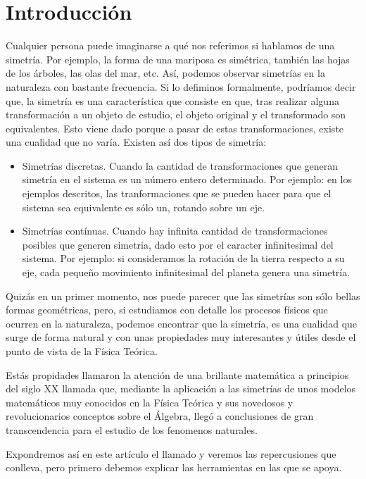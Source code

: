 \section{Introducción}\label{sec:introduccion}

Cualquier persona puede imaginarse a qué nos referimos si hablamos de una simetría. Por ejemplo, la forma de una mariposa es simétrica, también las hojas de los árboles, las olas del mar, etc. Así, podemos observar simetrías en la naturaleza con bastante frecuencia.
Si lo defiminos formalmente, podríamos decir que, la simetría es una característica que consiste en que, tras realizar alguna transformación a un objeto de estudio, el objeto original y el transformado son equivalentes. Esto viene dado porque a pasar de estas transformaciones, existe una cualidad que no varía.
Existen así dos tipos de simetría:
\begin{itemize}
    \item Simetrías discretas. Cuando la cantidad de transformaciones que generan simetría en el sistema es un número entero determinado. Por ejemplo: en los ejemplos descritos, las tranformaciones que se pueden hacer para que el sistema sea equivalente es sólo un, rotando sobre un eje.
    \item Simetrías contínuas. Cuando hay infinita cantidad de transformaciones posibles que generen simetria, dado esto por el caracter infinitesimal del sistema. Por ejemplo: si consideramos la rotación de la tierra respecto a su eje, cada pequeño movimiento infinitesimal del planeta genera una simetría.
\end{itemize}

Quizás en un primer momento, nos puede parecer que las simetrías son sólo bellas formas geométricas, pero, si estudiamos con detalle los procesos físicos que ocurren en la naturaleza, podemos encontrar que la simetría, es una cualidad que surge de forma natural y con unas propiedades muy interesantes y útiles desde el punto de vista de la Física Teórica.

Estás propidades llamaron la atención de una brillante matemática a principios del siglo XX llamada   que, mediante la aplicación a las simetrías de unos modelos matemáticos muy conocidos en la Física Teórica y sus novedosos y revolucionarios conceptos sobre el Álgebra, llegó a conclusiones de gran transcendencia para el estudio de los fenomenos naturales.

Expondremos así en este artículo el llamado   y veremos las repercusiones que conlleva, pero primero debemos explicar las herramientas en las que se apoya. 




